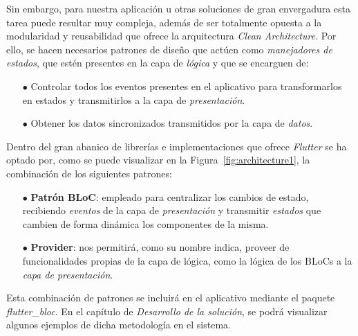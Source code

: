 Sin embargo, para nuestra aplicación u otras soluciones de gran envergadura esta tarea puede resultar muy compleja,
además de ser totalmente opuesta a la modularidad y reusabilidad que ofrece la arquitectura \textit{Clean Architecture}.
Por ello, se hacen necesarios patrones de diseño que actúen como
\textit{manejadores de estados}, que estén presentes en la capa de \textit{lógica} y que se encarguen de:

\begin{itemize}
  \item[$\bullet$] Controlar todos los eventos presentes en el aplicativo 
  para transformarlos en estados y transmitirlos a la capa de \textit{presentación}.
  \item[$\bullet$] Obtener los datos sincronizados transmitidos por la capa de \textit{datos}.
\end{itemize}

Dentro del gran abanico de librerías e implementaciones que ofrece \textit{Flutter} se ha optado por, como se puede 
visualizar en la Figura~\ref{fig:architecture1}, la combinación de los siguientes patrones:

\begin{itemize}
  \item[$\bullet$] \textbf{Patrón BLoC}: empleado para centralizar los cambios de estado, recibiendo \textit{eventos}
   de la capa de \textit{presentación} y transmitir \textit{estados} que cambien de forma dinámica los componentes de
    la misma.
  \item[$\bullet$] \textbf{Provider}: nos permitirá, como su nombre indica, proveer de funcionalidades propias
  de la capa de lógica, como la lógica de los BLoCs a la \textit{capa de presentación}.
\end{itemize}

Esta combinación de patrones se incluirá en el aplicativo mediante el paquete \textit{flutter\_bloc}.
En el capítulo de \textit{Desarrollo de la solución}, se podrá visualizar algunos ejemplos de dicha metodología en
el sistema.
